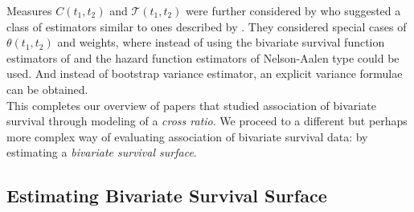 \documentclass[]{article}
\begin{document}
Measures $C(t_1, t_2)$ and $\mathcal{T}(t_1, t_2)$ were further considered by
\cite{fan2000class} who suggested a class of estimators similar to ones described by \cite{fan2000dependence}. They considered special cases of $\theta(t_1, t_2)$ and weights, where instead of using the bivariate survival function estimators of \cite{dabrowska1988kaplan} and \cite{prentice1992covariance} the hazard function estimators of Nelson-Aalen type could be used. And instead of bootstrap variance estimator, an explicit variance formulae can be obtained.\\

This completes our overview of papers that studied association of bivariate survival through modeling of a \emph{cross ratio}. We proceed to a different but perhaps more complex way of evaluating association of bivariate survival data: by estimating a \emph{bivariate survival surface}.

\subsection{Estimating Bivariate Survival Surface}
\end{document}
